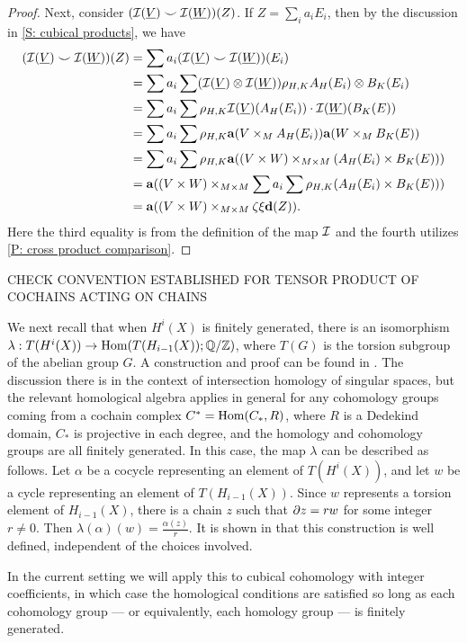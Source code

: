 \documentclass{amsart}
\begin{document}
\begin{proof}
Next, consider $(\mathcal{I}(\underline{V}) \smile \mathcal{I}(\underline{W}))(Z)$. If $Z=\sum_i a_iE_i$, then by the discussion in \cref{S: cubical products}, we have
\begin{align*}
(\mathcal{I}(\underline{V}) \smile \mathcal{I}(\underline{W}))(Z)
&=\sum a_i (\mathcal{I}(\underline{V}) \smile \mathcal{I}(\underline{W}))(E_i)\\
&=\sum a_i\sum (\mathcal{I}(\underline{V}) \otimes \mathcal{I}(\underline{W}))  \rho_{H,K}A_H(E_i) \otimes B_K(E_i)\\
&=\sum a_i\sum \rho_{H,K}\mathcal{I}(\underline{V})(A_H(E_i))\cdot \mathcal{I}(\underline{W})(B_K(E))\\
&=\sum a_i\sum \rho_{H,K}\mathbf{a}(V\times_M A_H(E_i))\mathbf{a}(W\times_M B_K(E))\\
&=\sum a_i\sum \rho_{H,K}\mathbf{a}((V\times W)\times_{M\times M}( A_H(E_i)\times B_K(E)))\\
&=\mathbf{a}((V\times W)\times_{M\times M}\sum a_i\sum \rho_{H,K}( A_H(E_i)\times B_K(E)))\\
&=\mathbf{a}((V\times W)\times_{M\times M}\zeta\xi\mathbf{d}(Z)).\\
\end{align*}
Here the third equality is from the definition of the map $\mathcal{I}$ and the fourth utilizes \cref{P: cross product comparison}.
\end{proof}

CHECK CONVENTION ESTABLISHED FOR TENSOR PRODUCT OF COCHAINS ACTING ON CHAINS



We next recall that when $H^i(X)$ is finitely generated, there is an isomorphism $\lambda:T(H^i(X))\to \textup{Hom}(T(H_{i-1}(X));\mathbb{Q}/\mathbb{Z})$, where $T(G)$ is the torsion subgroup of the abelian group $G$. A construction and proof can be found in \cite[Section 8.4.3]{Frie20}. The discussion there is in the context of intersection homology of singular spaces, but the relevant homological algebra applies in general for any cohomology groups coming from a cochain complex $C^*=\textup{Hom}(C_*,R)$, where $R$ is a Dedekind domain, $C_*$ is projective in each degree, and the homology and cohomology groups are all finitely generated. In this case, the map $\lambda$ can be described as follows. Let $\alpha$ be a cocycle representing an element of $T(H^i(X))$, and let $w$ be a cycle representing an element of $T(H_{i-1}(X))$. Since $w$ represents a torsion element of $H_{i-1}(X)$, there is a chain $z$ such that $\partial z=rw$ for some integer $r\neq 0$. Then $\lambda(\alpha)(w)=\frac{\alpha(z)}{r}$. It is shown in \cite{Frie20} that this construction is well defined, independent of the choices involved.

In the current setting we will apply this to cubical cohomology with integer coefficients, in which case the homological conditions are satisfied so long as each cohomology group --- or equivalently, each homology group --- is finitely generated.
\end{document}
